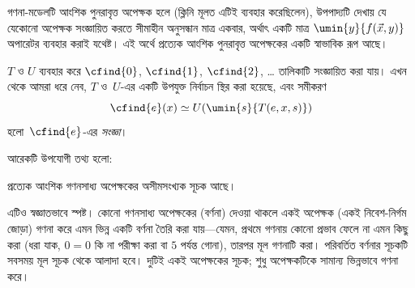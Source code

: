 \documentclass[../../../include/open-logic-section]{subfiles}
\begin{document}
গণনা-মডেলটি আংশিক পুনরাবৃত্ত অপেক্ষক হলে (ক্লিনি মূলত এটিই ব্যবহার
করেছিলেন), উপপাদ্যটি দেখায় যে যেকোনো অপেক্ষক সংজ্ঞায়িত করতে সীমাহীন
অনুসন্ধান মাত্র একবার, অর্থাৎ একটি মাত্র $\umin{y}{f(\vec x, y)}$
অপারেটর ব্যবহার করাই যথেষ্ট। এই অর্থে প্রত্যেক আংশিক পুনরাবৃত্ত অপেক্ষকের
একটি স্বাভাবিক রূপ আছে।

$T$ ও $U$ ব্যবহার করে $\cfind{0}$, $\cfind{1}$, $\cfind{2}$, \dots
তালিকাটি সংজ্ঞায়িত করা যায়। এখন থেকে আমরা ধরে নেব, $T$ ও~$U$-এর একটি
উপযুক্ত নির্বাচন স্থির করা হয়েছে, এবং সমীকরণ
\[
\cfind{e}(x) \simeq U(\umin{s}{T(e,x,s)})
\]
হলো~$\cfind{e}$-এর \emph{সংজ্ঞা}।

আরেকটি উপযোগী তথ্য হলো:

\begin{thm}
প্রত্যেক আংশিক গণনসাধ্য অপেক্ষকের অসীমসংখ্যক সূচক আছে।
\end{thm}

এটিও স্বজ্ঞাতভাবে স্পষ্ট। কোনো গণনসাধ্য অপেক্ষকের (বর্ণনা) দেওয়া থাকলে
একই অপেক্ষক (একই নিবেশ-নির্গম জোড়া) গণনা করে এমন ভিন্ন একটি বর্ণনা
তৈরি করা যায়—যেমন, প্রথমে গণনায় কোনো প্রভাব ফেলে না এমন কিছু করা
(ধরা যাক, $0 = 0$ কি না পরীক্ষা করা বা $5$ পর্যন্ত গোনা), তারপর মূল
গণনাটি করা। পরিবর্তিত বর্ণনার সূচকটি সবসময় মূল সূচক থেকে আলাদা হবে।
দুটিই একই অপেক্ষকের সূচক; শুধু অপেক্ষকটিকে সামান্য ভিন্নভাবে গণনা করে।
\end{document}
